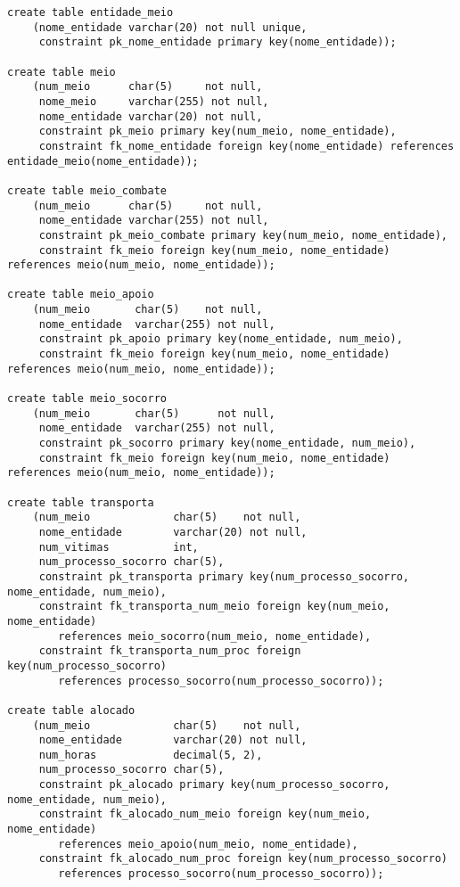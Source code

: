 \documentclass[10pt,a4paper]{article}
\begin{document}
\begin{verbatim}
create table entidade_meio
    (nome_entidade varchar(20) not null unique,
     constraint pk_nome_entidade primary key(nome_entidade));

create table meio
    (num_meio      char(5)     not null,
     nome_meio     varchar(255) not null,
     nome_entidade varchar(20) not null,
     constraint pk_meio primary key(num_meio, nome_entidade),
     constraint fk_nome_entidade foreign key(nome_entidade) references entidade_meio(nome_entidade));

create table meio_combate
    (num_meio      char(5)     not null,
     nome_entidade varchar(255) not null,
     constraint pk_meio_combate primary key(num_meio, nome_entidade),
     constraint fk_meio foreign key(num_meio, nome_entidade) references meio(num_meio, nome_entidade));

create table meio_apoio
    (num_meio       char(5)    not null,
     nome_entidade  varchar(255) not null,
     constraint pk_apoio primary key(nome_entidade, num_meio),
     constraint fk_meio foreign key(num_meio, nome_entidade) references meio(num_meio, nome_entidade));

create table meio_socorro
    (num_meio       char(5)      not null,
     nome_entidade  varchar(255) not null,
     constraint pk_socorro primary key(nome_entidade, num_meio),
     constraint fk_meio foreign key(num_meio, nome_entidade) references meio(num_meio, nome_entidade));

create table transporta
    (num_meio             char(5)    not null,
     nome_entidade        varchar(20) not null,
     num_vitimas          int,
     num_processo_socorro char(5),
     constraint pk_transporta primary key(num_processo_socorro, nome_entidade, num_meio),
     constraint fk_transporta_num_meio foreign key(num_meio, nome_entidade)
        references meio_socorro(num_meio, nome_entidade),
     constraint fk_transporta_num_proc foreign key(num_processo_socorro)
        references processo_socorro(num_processo_socorro));
    
create table alocado
    (num_meio             char(5)    not null,
     nome_entidade        varchar(20) not null,     
     num_horas            decimal(5, 2),
     num_processo_socorro char(5),
     constraint pk_alocado primary key(num_processo_socorro, nome_entidade, num_meio),
     constraint fk_alocado_num_meio foreign key(num_meio, nome_entidade) 
        references meio_apoio(num_meio, nome_entidade),
     constraint fk_alocado_num_proc foreign key(num_processo_socorro) 
        references processo_socorro(num_processo_socorro));


\end{verbatim}
\end{document}
